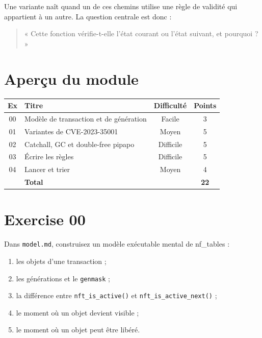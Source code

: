 \documentclass{training}
\begin{document}
Une variante naît quand un de ces chemins utilise une règle de validité qui
appartient à un autre. La question centrale est donc :

\begin{quote}
« Cette fonction vérifie-t-elle l'état courant ou l'état suivant, et
pourquoi ? »
\end{quote}

\chapter{Aperçu du module}

\begin{center}
\begin{tabularx}{\linewidth}{|c|l|c|c|}
\hline
\textbf{Ex} & \textbf{Titre} & \textbf{Difficulté} & \textbf{Points} \\ \hline
00 & Modèle de transaction et de génération & Facile & 3 \\
01 & Variantes de CVE-2023-35001 & Moyen & 5 \\
02 & Catchall, GC et double-free pipapo & Difficile & 5 \\
03 & Écrire les règles & Difficile & 5 \\
04 & Lancer et trier & Moyen & 4 \\ \hline
& \textbf{Total} & & \textbf{22} \\ \hline
\end{tabularx}
\end{center}

\startexercices

\chapter{Exercise 00}
\makeheaderfiles

Dans \texttt{model.md}, construisez un modèle exécutable mental de
nf\_tables :

\begin{enumerate}
  \item les objets d'une transaction ;
  \item les générations et le \texttt{genmask} ;
  \item la différence entre \texttt{nft\_is\_active()} et
        \texttt{nft\_is\_active\_next()} ;
  \item le moment où un objet devient visible ;
  \item le moment où un objet peut être libéré.
\end{enumerate}
\end{document}
